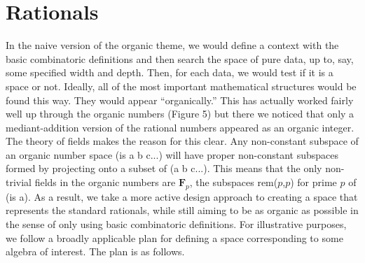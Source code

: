 \documentclass[11pt]{article}
\begin{document}
\section{Rationals} 

       In the naive version of the organic theme, we would define a context with the basic combinatoric definitions and then 
search the space of pure data, up to, say, some specified width and depth.  Then, for each data, we would test if it is 
a space or not.  Ideally, all of the most important mathematical structures would be found this way.  They would appear ``organically.'' 
This has actually worked fairly well up through the organic numbers (Figure 5) but there we noticed that only a mediant-addition 
version of the rational numbers appeared as an organic integer.  The theory of fields makes the reason for this clear.  
Any non-constant subspace of an organic number space (is a b c...) will have proper non-constant subspaces formed by 
projecting onto a subset of (a b c...).  This means that the only non-trivial fields in the organic numbers are ${\mathbf F}_p$, 
the subspaces rem($p$,$p$) for prime $p$ of (is a).  As a result, we take a more active design approach to creating a space that represents the standard rationals, while still aiming to be as organic as possible in the sense of only using basic combinatoric definitions.  For illustrative purposes, we follow a broadly applicable plan for defining a space corresponding to some algebra of interest.  The plan is as follows. 
 
\end{document}
